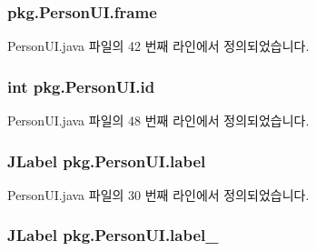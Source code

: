 \subsubsection[{\texorpdfstring{frame}{frame}}]{ pkg.\+Person\+U\+I.\+frame\hspace{0.3cm}{\ttfamily [private]}}\hypertarget{classpkg_1_1_person_u_i_ab7d796c52a55426d71e77f6496bd4012}{}\label{classpkg_1_1_person_u_i_ab7d796c52a55426d71e77f6496bd4012}


Person\+U\+I.\+java 파일의 42 번째 라인에서 정의되었습니다.

\subsubsection[{\texorpdfstring{id}{id}}]{\setlength{\rightskip}{0pt plus 5cm}int pkg.\+Person\+U\+I.\+id\hspace{0.3cm}{\ttfamily [private]}}\hypertarget{classpkg_1_1_person_u_i_a0e597f46bc66957eb8b888fab950e712}{}\label{classpkg_1_1_person_u_i_a0e597f46bc66957eb8b888fab950e712}


Person\+U\+I.\+java 파일의 48 번째 라인에서 정의되었습니다.

\subsubsection[{\texorpdfstring{label}{label}}]{\setlength{\rightskip}{0pt plus 5cm}J\+Label pkg.\+Person\+U\+I.\+label\hspace{0.3cm}{\ttfamily [private]}}\hypertarget{classpkg_1_1_person_u_i_a161533277b04a1a726c08526184d9fad}{}\label{classpkg_1_1_person_u_i_a161533277b04a1a726c08526184d9fad}


Person\+U\+I.\+java 파일의 30 번째 라인에서 정의되었습니다.

\subsubsection[{\texorpdfstring{label\+\_\+1}{label_1}}]{\setlength{\rightskip}{0pt plus 5cm}J\+Label pkg.\+Person\+U\+I.\+label\+\_\hspace{0.3cm}{\ttfamily [private]}}\hypertarget{classpkg_1_1_person_u_i_a559152fef6563f4ee1da958263beb299}{}\label{classpkg_1_1_person_u_i_a559152fef6563f4ee1da958263beb299}


